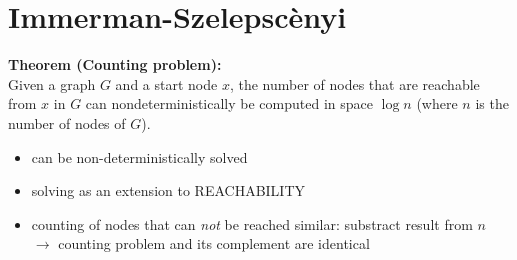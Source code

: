\documentclass[a4]{scrartcl}
\begin{document}
\section*{Immerman-Szelepscènyi}

\textbf{Theorem (Counting problem):} \\
Given a graph $G$ and a start node $x$, the number of nodes that are reachable from $x$ in $G$ can nondeterministically be computed in space
$\log n$ (where $n$ is the number of nodes of $G$). \\



\begin{itemize}
\item can be non-deterministically solved
\item solving as an extension to REACHABILITY
\item counting of nodes that can \textit{not} be reached similar: substract result from $n$ \\
$\rightarrow$ counting problem and its complement are identical
\end{itemize}
\end{document}
